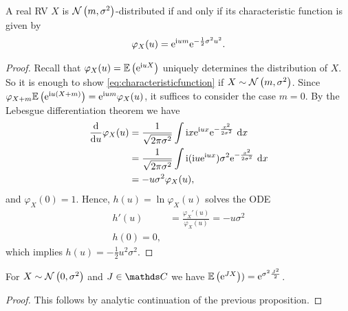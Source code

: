 \begin{prop}
A real RV $X$ is $\mathcal{N}\left(m,\sigma^2\right)$-distributed if and only if
its characteristic function is given by
\begin{align}\label{eq:characteristicfunction}
\varphi_X(u)=\mathrm{e}^{\mathrm{i} um}\mathrm{e}^{-\frac{1}{2}\sigma^2u^2}.
\end{align}
\begin{proof}
Recall that $\varphi_X(u)=\mathbb{E}\left(\mathrm{e}^{\mathrm{i} uX}\right)$ uniquely determines the distribution of $X$.
So it is enough to show \eqref{eq:characteristicfunction} if
$X\sim \mathcal{N}\left(m,\sigma^2\right)$.
Since $\varphi_{X+m}\mathbb{E}\left(\mathrm{e}^{\mathrm{i} u(X+m)}\right)=\mathrm{e}^{\mathrm{i} um}\varphi_X(u)$,
it suffices to consider the case $m=0$.
By the Lebesgue differentiation theorem we have
\begin{align*}
\frac{\mathrm{d}}{\mathrm{d}u}\varphi_X(u)&=\frac{1}{\sqrt{2\pi \sigma^2}} \int \mathrm{i} x\mathrm{e}^{\mathrm{i} ux}\mathrm{e}^{-\frac{x^2}{2 \sigma^2}}~\mathrm{d}x\\
&=\frac{1}{\sqrt{2 \pi \sigma^2}} \int \mathrm{i} (\mathrm{i} u \mathrm{e}^{\mathrm{i} ux})\sigma^2 \mathrm{e}^{-\frac{x^2}{2 \sigma^2}}~\mathrm{d}x\\
&=-u \sigma^2 \varphi_X(u),
\end{align*}
and $\varphi_X(0)=1$. Hence, $h(u)=\ln \varphi_X(u)$ solves the ODE
\begin{align*}
h'(u)&=\frac{\varphi_X'(u)}{\varphi_X(u)}=-u \sigma^2\\
h(0)=0,
\end{align*}
which implies $h(u)=-\frac{1}{2}u^2\sigma^2$.
\end{proof}
\end{prop}

\begin{cor}
For $X \sim \mathcal{N}\left(0,\sigma^2\right)$ and $J\in \C$ we have $\mathbb{E}\left(\mathrm{e}^{JX}\right))=\mathrm{e}^{\sigma^2 \frac{J^2}{2}}$.
\begin{proof}
This follows by analytic continuation of the previous proposition.
\end{proof}
\end{cor}

